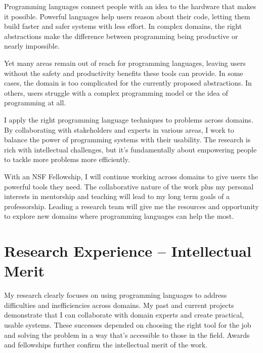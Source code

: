 \documentclass[12pt]{article}
\begin{document}
Programming languages connect people with an idea to the hardware that makes it possible.
Powerful languages help users reason about their code, letting them build faster and safer systems with less effort.
In complex domains, the right abstractions make the difference between programming being productive or nearly impossible.

Yet many areas remain out of reach for programming languages, leaving users without the safety and productivity benefits these tools can provide.
In some cases, the domain is too complicated for the currently proposed abstractions.
In others, users struggle with a complex programming model or the idea of programming at all.

I apply the right programming language techniques to problems across domains.
By collaborating with stakeholders and experts in various areas, I work to balance the power of programming systems with their usability.
The research is rich with intellectual challenges, but it's fundamentally about empowering people to tackle more problems more efficiently.

With an NSF Fellowship, I will continue working across domains to give users the powerful tools they need.
The collaborative nature of the work plus my personal interests in mentorship and teaching will lead to my long term goals of a professorship.
Leading a research team will give me the resources and opportunity to explore new domains where programming languages can help the most.

\section*{Research Experience -- Intellectual Merit}

My research clearly focuses on using programming languages to address difficulties and inefficiencies across domains.
My past and current projects demonstrate that I can collaborate with domain experts and create practical, usable systems.
These successes depended on choosing the right tool for the job and solving the problem in a way that's accessible to those in the field.
Awards and fellowships further confirm the intellectual merit of the work.


\end{document}
